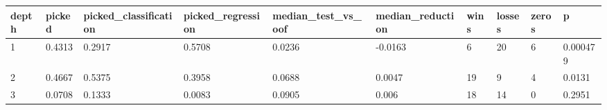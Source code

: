 \begin{tabular}{llllllllll}
\toprule
depth & picked & picked\_classification & picked\_regression & median\_test\_vs\_oof & median\_reduction & wins & losses & zeros & p \\
\midrule
1 & 0.4313 & 0.2917 & 0.5708 & 0.0236 & -0.0163 & 6 & 20 & 6 & 0.000479 \\
2 & 0.4667 & 0.5375 & 0.3958 & 0.0688 & 0.0047 & 19 & 9 & 4 & 0.0131 \\
3 & 0.0708 & 0.1333 & 0.0083 & 0.0905 & 0.006 & 18 & 14 & 0 & 0.2951 \\
\bottomrule
\end{tabular}
